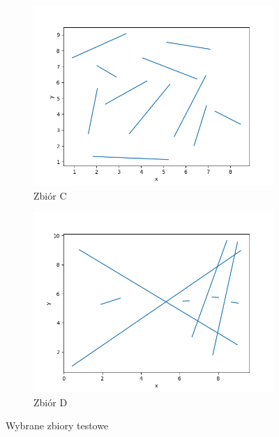 \documentclass[11pt,a4paper]{article}
\begin{document}
\begin{figure}[H]
\begin{subfigure}[b]{0.46\textwidth}
        \includegraphics[scale=0.4]{res/sec_c.png}
        \caption{
            Zbiór C
        }
    \end{subfigure}
    \begin{subfigure}[b]{0.46\textwidth}
        \centering
        \includegraphics[scale=0.4]{res/sec_d.png}
        \caption{
            Zbiór D
        }
    \end{subfigure}
    \caption{Wybrane zbiory testowe}
\end{figure}
\end{document}

